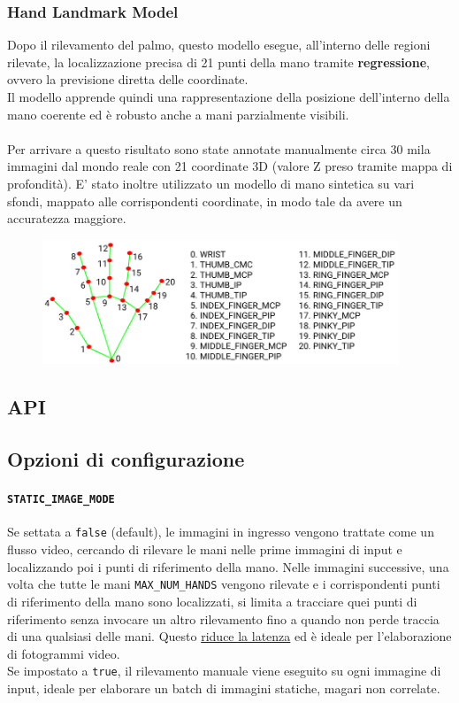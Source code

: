 \subsubsection{Hand Landmark Model} 

Dopo il rilevamento del palmo, questo modello esegue, all'interno delle regioni rilevate, la localizzazione precisa di 21 punti della mano tramite \textbf{regressione}, ovvero la previsione diretta delle coordinate.\\
Il modello apprende quindi una rappresentazione della posizione dell'interno della mano coerente ed è robusto anche a mani parzialmente visibili.\\
\\
\noindent Per arrivare a questo risultato sono state annotate manualmente circa 30 mila immagini dal mondo reale con 21 coordinate 3D (valore Z preso tramite mappa di profondità). E' stato inoltre utilizzato un modello di mano sintetica su vari sfondi, mappato alle corrispondenti coordinate, in modo tale da avere un accuratezza maggiore.
\begin{figure}[H]
    \centering
    \includegraphics[width=0.95\textwidth]{images/landmarks.png}
\end{figure}

\newpage
\subsection{API} 

\subsection{Opzioni di configurazione}


\paragraph{\texttt{STATIC\_IMAGE\_MODE}} Se settata a \texttt{false} (default), le immagini in ingresso vengono trattate come un flusso video, cercando di rilevare le mani nelle prime immagini di input e localizzando poi i punti di riferimento della mano. Nelle immagini successive, una volta che tutte le mani \texttt{MAX\_NUM\_HANDS} vengono rilevate e i corrispondenti punti di riferimento della mano sono localizzati, si limita a tracciare quei punti di riferimento senza invocare un altro rilevamento fino a quando non perde traccia di una qualsiasi delle mani. Questo \underline{riduce la latenza} ed è ideale per l'elaborazione di fotogrammi video.\\
Se impostato a \texttt{true}, il rilevamento manuale viene eseguito su ogni immagine di input, ideale per elaborare un batch di immagini statiche, magari non correlate.

